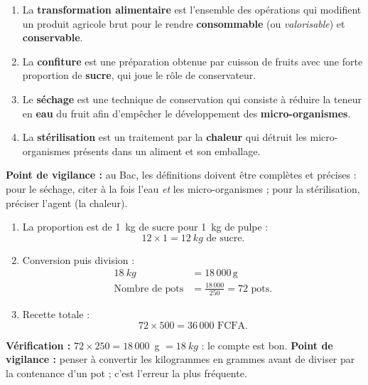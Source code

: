 \documentclass[11pt]{article}
\begin{document}
\begin{corrige}
\begin{enumerate}
\item La \textbf{transformation alimentaire} est l'ensemble des opérations qui modifient un produit agricole brut pour le rendre \textbf{consommable} (ou \emph{valorisable}) et \textbf{conservable}.
\item La \textbf{confiture} est une préparation obtenue par cuisson de fruits avec une forte proportion de \textbf{sucre}, qui joue le rôle de conservateur.
\item Le \textbf{séchage} est une technique de conservation qui consiste à réduire la teneur en \textbf{eau} du fruit afin d'empêcher le développement des \textbf{micro-organismes}.
\item La \textbf{stérilisation} est un traitement par la \textbf{chaleur} qui détruit les micro-organismes présents dans un aliment et son emballage.
\end{enumerate}
\textbf{Point de vigilance :} au Bac, les définitions doivent être complètes et précises : pour le séchage, citer à la fois l'eau \emph{et} les micro-organismes ; pour la stérilisation, préciser l'agent (la chaleur).
\end{corrige}

\begin{corrige}
\begin{enumerate}
\item La proportion est de \SI{1}{kg} de sucre pour \SI{1}{kg} de pulpe :
\[ 12 \times 1 = \SI{12}{kg} \text{ de sucre.} \]
\item Conversion puis division :
\begin{align*}
\SI{18}{kg} &= 18\,000\,\text{g}\\
\text{Nombre de pots} &= \frac{18\,000}{250} = 72 \text{ pots.}
\end{align*}
\item Recette totale :
\[ 72 \times 500 = 36\,000 \text{ FCFA.} \]
\end{enumerate}
\textbf{Vérification :} $72 \times 250 = 18\,000$~g $= \SI{18}{kg}$ : le compte est bon.
\textbf{Point de vigilance :} penser à convertir les kilogrammes en grammes avant de diviser par la contenance d'un pot ; c'est l'erreur la plus fréquente.
\end{corrige}
\end{document}
